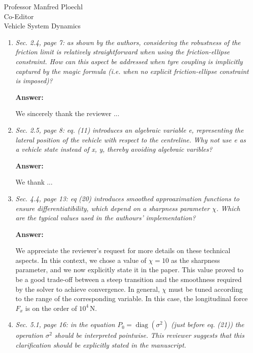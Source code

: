 \documentclass{letter}
\renewcommand\ul[1]{#1} %
\DeclareMathOperator{\diag}{diag}
\begin{document}
\begin{letter}{Professor Manfred Ploechl\\
Co-Editor\\
Vehicle System Dynamics}
\begin{enumerate}
\hrulefill

\item
\textit{Sec. 2.4, page 7: as shown by the authors, considering the robustness of the friction limit is relatively straightforward when using the friction-ellipse constraint. How can this aspect be addressed when tyre coupling is implicitly captured by the magic formula (i.e. when no explicit friction-ellipse constraint is imposed)?}

\vspace{2mm}

\textbf{Answer:}

We sincerely thank the reviewer ...

\hrulefill

\item
\textit{Sec. 2.5, page 8: eq. (11) introduces an algebraic variable e, representing the lateral position of the vehicle with respect to the centreline. Why not use e as a vehicle state instead of x, y, thereby avoiding algebraic varibles?}

\vspace{2mm}

\textbf{Answer:}

We thank ...

\hrulefill

\item
\textit{Sec. 4.4, page 13: eq (20) introduces smoothed approaximation functions to ensure differentiatibility, which depend on a sharpness parameter $\chi$. Which are the typical values used in the authours' implementation?}

\vspace{2mm}

\textbf{Answer:}

We appreciate the reviewer's request \ul{for more details on these technical aspects.} In this context, we chose a value of $\chi=10$ as the sharpness parameter, and we now explicitly state it in the paper. This value proved to be a good trade-off between a steep transition and the smoothness required by the solver to achieve convergence. In general, $\chi$ must be tuned according to the range of the corresponding variable. In this case, the longitudinal force $F_x$ is on the order of $10^4$\,N.

\hrulefill

\item
\textit{Sec. 5.1, page 16: in the equation $P_0=\diag(\sigma^2)$ (just before eq. (21)) the operation $\sigma^2$ should be interpreted pointwise. This reviewer suggests that this clarification should be explicitly stated in the manuscript.}


\end{enumerate}
\end{letter}
\end{document}
